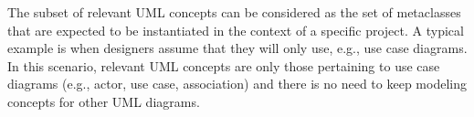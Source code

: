 The subset of relevant UML concepts can be considered as the set of metaclasses that are expected to be instantiated
in the context of a specific project. %
A typical example is when designers assume that they will only use, e.g., use case diagrams.
In this scenario, relevant UML concepts are only those pertaining to use case diagrams (e.g., actor, use case, association)
and there is no need to keep modeling concepts for other UML diagrams.
%
\vspace{-.2cm}

